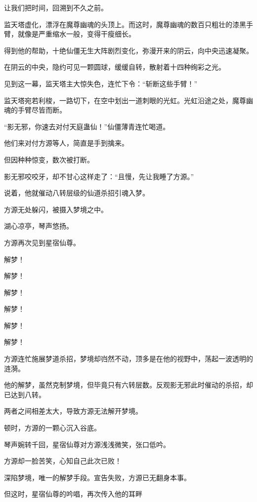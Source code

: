 
\begin{this_body}



让我们把时间，回溯到不久之前。

监天塔虚化，漂浮在魔尊幽魂的头顶上。而这时，魔尊幽魂的数百只粗壮的漆黑手臂，就像是严重缩水一般，变得干瘦细长。

得到他的帮助，十绝仙僵无生大阵剧烈变化，弥漫开来的阴云，向中央迅速凝聚。

在阴云的中央，隐约可见一颗圆球，缓缓自转，散射着十四种绚彩之光。

见到这一幕，监天塔主大惊失色，连忙下令：“斩断这些手臂！”

监天塔宛若利梭，一路切下，在空中划出一道刺眼的光虹。光虹沿途之处，魔尊幽魂的手臂尽皆而断。

“影无邪，你速去对付天庭蛊仙！”仙僵薄青连忙喝道。

他们来对付方源等人，简直是手到擒来。

但因种种惊变，数次被打断。

影无邪咬咬牙，却不甘心这样走了：“且慢，先让我睡了方源。”

说着，他就催动八转层级的仙道杀招引魂入梦。

方源无处躲闪，被摄入梦境之中。

湖心凉亭，琴声悠扬。

方源再次见到星宿仙尊。

解梦！

解梦！

解梦！

解梦！

解梦！

解梦！

方源连忙施展梦道杀招，梦境却岿然不动，顶多是在他的视野中，荡起一波透明的涟漪。

他的解梦，虽然克制梦境，但毕竟只有六转层数。反观影无邪此时催动的杀招，却已达到八转。

两者之间相差太大，导致方源无法解开梦境。

顿时，方源的一颗心沉入谷底。

琴声婉转千回，星宿仙尊对方源浅浅微笑，张口低吟。

方源却一脸苦笑，心知自己此次已败！

深陷梦境，唯一的解梦手段。宣告失败，方源已无翻身本事。

但这时，星宿仙尊的吟唱，再次传入他的耳畔


\end{this_body}
